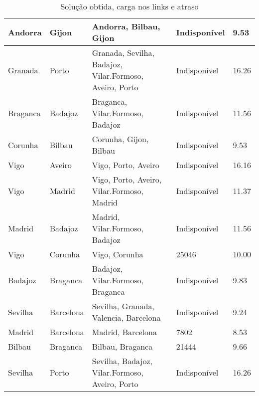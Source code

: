 \begin{table}[!htb]
{\begin{tabular}{|l|l|l|l|l|}
Andorra & Gijon & Andorra, Bilbau, Gijon & Indisponível & 9.53 \\ \hline
Granada & Porto & Granada, Sevilha, Badajoz, Vilar.Formoso, Aveiro, Porto & Indisponível & 16.26 \\ \hline
Braganca & Badajoz & Braganca, Vilar.Formoso, Badajoz & Indisponível & 11.56 \\ \hline
Corunha & Bilbau & Corunha, Gijon, Bilbau & Indisponível & 9.53 \\ \hline
Vigo & Aveiro & Vigo, Porto, Aveiro & Indisponível & 16.16 \\ \hline
Vigo & Madrid & Vigo, Porto, Aveiro, Vilar.Formoso, Madrid & Indisponível & 11.37 \\ \hline
Madrid & Badajoz & Madrid, Vilar.Formoso, Badajoz & Indisponível & 11.56 \\ \hline
Vigo & Corunha & Vigo, Corunha & 25046 & 10.00 \\ \hline
Badajoz & Braganca & Badajoz, Vilar.Formoso, Braganca & Indisponível & 9.83 \\ \hline
Sevilha & Barcelona & Sevilha, Granada, Valencia, Barcelona & Indisponível & 9.24 \\ \hline
Madrid & Barcelona & Madrid, Barcelona & 7802 & 8.53 \\ \hline
Bilbau & Braganca & Bilbau, Braganca & 21444 & 9.66 \\ \hline
Sevilha & Porto & Sevilha, Badajoz, Vilar.Formoso, Aveiro, Porto & Indisponível & 16.26 \\ \hline
\end{tabular}}
\caption[]{Solução obtida, carga nos links e atraso}
\end{table}


